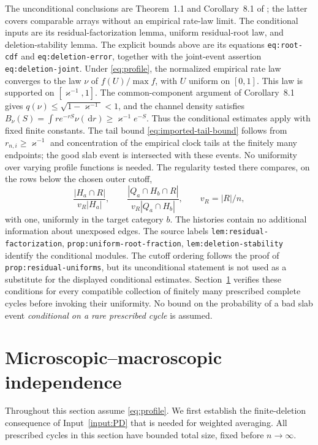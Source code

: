 \documentclass[11pt]{article}
\numberwithin{equation}{section}
\newcommand{\dd}{\,\mathrm d}
\theoremstyle{definition}
\theoremstyle{remark}
\begin{document}
The unconditional conclusions are Theorem~1.1 and Corollary~8.1 of
\cite{LongPD2026}; the latter covers comparable arrays without an empirical
rate-law limit.  The conditional inputs are its residual-factorization
lemma, uniform residual-root law, and deletion-stability lemma.  The
explicit bounds above are its equations \texttt{eq:root-cdf} and
\texttt{eq:deletion-error}, together with the joint-event assertion
\texttt{eq:deletion-joint}.  Under \eqref{eq:profile}, the normalized
empirical rate law converges to the law $\nu$ of $f(U)/\max f$, with $U$
uniform on $[0,1]$.  This law is supported on $[\varkappa^{-1},1]$.  The
common-component argument of Corollary~8.1 gives
$q(\nu)\le\sqrt{1-\varkappa^{-1}}<1$, and the channel density satisfies
$B_\nu(S)=\int r e^{-rS}\nu(\dd r)\ge\varkappa^{-1}e^{-S}$.
Thus the conditional estimates apply with
fixed finite constants.  The tail bound
\eqref{eq:imported-tail-bound} follows from $r_{n,i}\ge\varkappa^{-1}$ and
concentration of the empirical clock tails at the finitely many endpoints;
the good slab event is intersected with these events.  No uniformity over
varying profile functions is needed.
The regularity tested there compares, on the rows below the chosen outer
cutoff,
\[
 \frac{|H_a\cap R|}{v_R|H_a|},\qquad
 \frac{|Q_a\cap H_b\cap R|}{v_R|Q_a\cap H_b|},
 \qquad v_R=|R|/n,
\]
with one, uniformly in the target category $b$.  The histories contain no
additional information about unexposed edges.  The source labels
\texttt{lem:residual-factorization},
\texttt{prop:uniform-root-}\allowbreak\texttt{fraction},
\texttt{lem:deletion-stability} identify the conditional modules.
The cutoff ordering follows the proof of
\texttt{prop:residual-uniforms}, but its unconditional statement is not used as a substitute
for the displayed conditional estimates.
Section~\ref{sec:micro-macro} verifies these conditions for every compatible
collection of finitely many prescribed complete cycles before invoking
their uniformity.  No bound on the probability of a bad slab event
\emph{conditional on a rare prescribed cycle} is assumed.
\section{Microscopic--macroscopic independence}\label{sec:micro-macro}

Throughout this section assume \eqref{eq:profile}.  We first establish the
finite-deletion consequence of Input~\ref{input:PD} that is needed for
weighted averaging.  All prescribed cycles in this
section have bounded total size, fixed before $n\to\infty$.
\end{document}
